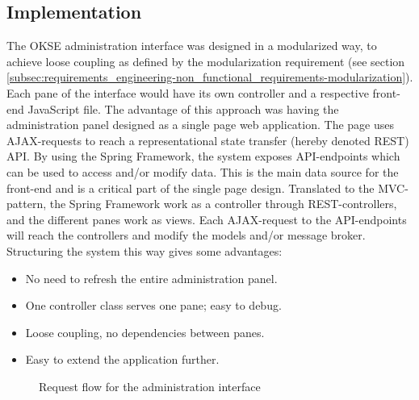 \subsection{Implementation}
\label{subsec:architecture_and_implementation-implementation}

The OKSE administration interface was designed in a modularized way, to achieve loose coupling as defined by the modularization requirement (see section  \ref{subsec:requirements_engineering-non_functional_requirements-modularization}). Each pane of the interface would have its own controller and a respective front-end JavaScript file. The advantage of this approach was having the administration panel designed as a single page web application. The page uses AJAX-requests to reach a representational state transfer (hereby denoted REST) API. By using the Spring Framework, the system exposes API-endpoints which can be used to access and/or modify data. This is the main data source for the front-end and is a critical part of the single page design. Translated to the MVC-pattern, the Spring Framework work as a controller through REST-controllers, and the different panes work as views. Each AJAX-request to the API-endpoints will reach the controllers and modify the models and/or message broker. Structuring the system this way gives some advantages: 

\begin{itemize}
    \item No need to refresh the entire administration panel.
    \item One controller class serves one pane; easy to debug.
    \item Loose coupling, no dependencies between panes.
    \item Easy to extend the application further.
\end{itemize}

\begin{center}
  \begin{figure}[ht!]
    \caption{Request flow for the administration interface}
    \label{fig:oac-request-flow}
  \end{figure}
\end{center}

